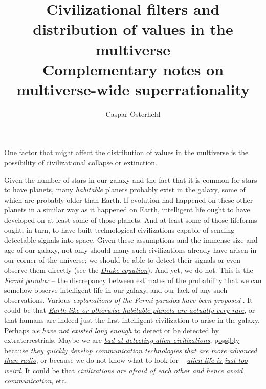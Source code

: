 \documentclass[]{article}
\title{Civilizational filters and distribution of values in the multiverse\\ \vspace{5mm} \small{Complementary notes on multiverse-wide superrationality}}
\author{Caspar \"Osterheld}
\date{}
\begin{document}
\maketitle

One factor that might affect the distribution of values in the
multiverse is the possibility of civilizational collapse or extinction.

Given the number of stars in our galaxy and the fact that it is common
for stars to have planets, many
\href{https://en.wikipedia.org/wiki/Planetary_habitability}{\emph{habitable}}
planets probably exist in the galaxy, some of which are probably older
than Earth. If evolution had happened on these other planets in a
similar way as it happened on Earth, intelligent life ought to have
developed on at least some of those planets. And at least some of those
lifeforms ought, in turn, to have built technological civilizations
capable of sending detectable signals into space. Given these
assumptions and the immense size and age of our galaxy, not only should
many such civilizations already have arisen in our corner of the
universe; we should be able to detect their signals or even observe them
directly (see the
\href{https://en.wikipedia.org/wiki/Drake_equation}{\emph{Drake
equation}}). And yet, we do not. This is the
\href{https://en.wikipedia.org/wiki/Fermi_paradox}{\emph{Fermi paradox}}
-- the discrepancy
between estimates of the probability that we can somehow observe
intelligent life in our galaxy, and our lack of any such observations.
Various
\href{https://en.wikipedia.org/wiki/Fermi_paradox\#Hypothetical_explanations_for_the_paradox}{\emph{explanations
of the Fermi paradox}}
\href{http://reducing-suffering.org/ranking-explanations-of-the-fermi-paradox/}{\emph{have
been proposed}} \parencite{Webb2015-vi}. It could be that
\href{https://en.wikipedia.org/wiki/Rare_Earth_hypothesis}{\emph{Earth-like
or otherwise habitable planets are actually very rare}}, or that humans
are indeed just the first intelligent civilization to arise in the
galaxy. Perhaps
\href{https://en.wikipedia.org/wiki/Fermi_paradox\#Human_beings_have_not_existed_long_enough}{\emph{we
have not existed long enough}} to detect or be detected by
extraterrestrials. Maybe we are
\href{https://en.wikipedia.org/wiki/Fermi_paradox\#Humans_are_not_listening_properly}{\emph{bad
at detecting alien civilizations}},
p\href{https://en.wikipedia.org/wiki/Fermi_paradox\#Humans_are_not_listening_properly}{o}s\href{https://en.wikipedia.org/wiki/Fermi_paradox\#Humans_are_not_listening_properly}{s}i\href{https://en.wikipedia.org/wiki/Fermi_paradox\#Humans_are_not_listening_properly}{b}l\href{https://en.wikipedia.org/wiki/Fermi_paradox\#Humans_are_not_listening_properly}{y}
because
\href{https://en.wikipedia.org/wiki/Fermi_paradox\#Civilizations_broadcast_detectable_radio_signals_only_for_a_brief_period_of_time}{\emph{they
quickly develop communication technologies that are more advanced than
radio}}, or because we do not know what to look for --
\href{https://en.wikipedia.org/wiki/Fermi_paradox\#They_are_too_alien}{\emph{alien
life is just too weird}}. It could be that
\href{https://en.wikipedia.org/wiki/Fermi_paradox\#It_is_dangerous_to_communicate}{\emph{civilizations
are afraid of each other and hence avoid communication}}, etc.
\end{document}
